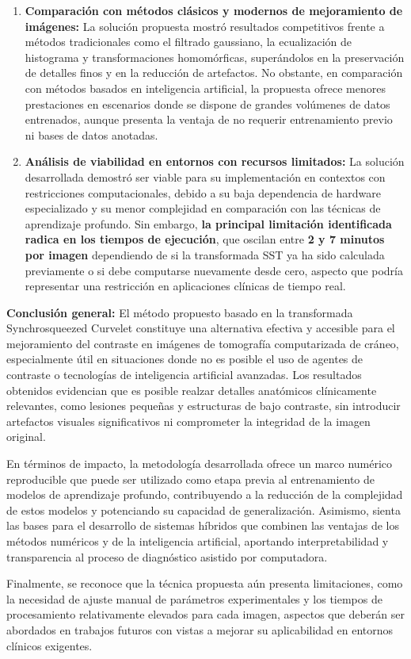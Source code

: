 \begin{conclusions}
\begin{enumerate}
        \item \textbf{Comparación con métodos clásicos y modernos de mejoramiento de imágenes:} La solución propuesta mostró resultados competitivos frente a métodos tradicionales como el filtrado gaussiano, la ecualización de histograma y transformaciones homomórficas, superándolos en la preservación de detalles finos y en la reducción de artefactos. No obstante, en comparación con métodos basados en inteligencia artificial, la propuesta ofrece menores prestaciones en escenarios donde se dispone de grandes volúmenes de datos entrenados, aunque presenta la ventaja de no requerir entrenamiento previo ni bases de datos anotadas.

        \item \textbf{Análisis de viabilidad en entornos con recursos limitados:} La solución desarrollada demostró ser viable para su implementación en contextos con restricciones computacionales, debido a su baja dependencia de hardware especializado y su menor complejidad en comparación con las técnicas de aprendizaje profundo. Sin embargo, \textbf{la principal limitación identificada radica en los tiempos de ejecución}, que oscilan entre \textbf{2 y 7 minutos por imagen} dependiendo de si la transformada SST ya ha sido calculada previamente o si debe computarse nuevamente desde cero, aspecto que podría representar una restricción en aplicaciones clínicas de tiempo real.
    \end{enumerate}

    \bigskip

    \textbf{Conclusión general:} El método propuesto basado en la transformada Synchrosqueezed Curvelet constituye una alternativa efectiva y accesible para el mejoramiento del contraste en imágenes de tomografía computarizada de cráneo, especialmente útil en situaciones donde no es posible el uso de agentes de contraste o tecnologías de inteligencia artificial avanzadas. Los resultados obtenidos evidencian que es posible realzar detalles anatómicos clínicamente relevantes, como lesiones pequeñas y estructuras de bajo contraste, sin introducir artefactos visuales significativos ni comprometer la integridad de la imagen original.

    En términos de impacto, la metodología desarrollada ofrece un marco numérico reproducible que puede ser utilizado como etapa previa al entrenamiento de modelos de aprendizaje profundo, contribuyendo a la reducción de la complejidad de estos modelos y potenciando su capacidad de generalización. Asimismo, sienta las bases para el desarrollo de sistemas híbridos que combinen las ventajas de los métodos numéricos y de la inteligencia artificial, aportando interpretabilidad y transparencia al proceso de diagnóstico asistido por computadora.

    Finalmente, se reconoce que la técnica propuesta aún presenta limitaciones, como la necesidad de ajuste manual de parámetros experimentales y los tiempos de procesamiento relativamente elevados para cada imagen, aspectos que deberán ser abordados en trabajos futuros con vistas a mejorar su aplicabilidad en entornos clínicos exigentes.
\end{conclusions}
